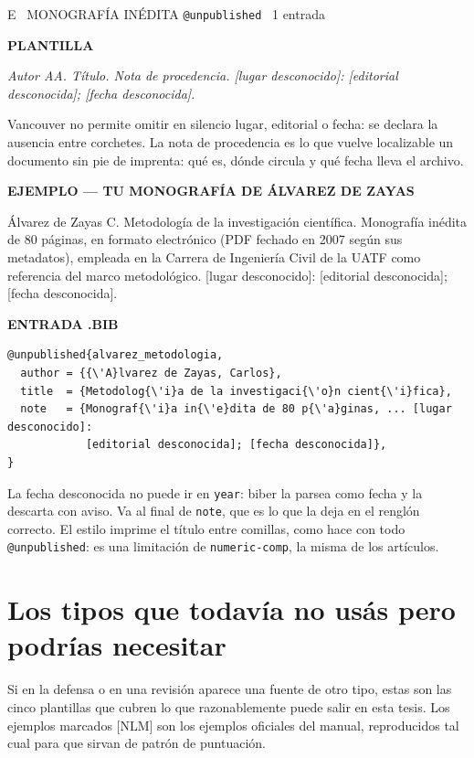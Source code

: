 \documentclass[11pt,a4paper]{article}
\newcommand{\rot}[1]{\vspace{2pt}\par{\footnotesize\bfseries\color{gris}\MakeUppercase{#1}}\par\vspace{1pt}}
\newcommand{\refv}[1]{\par{\small #1}\par}
\newcommand{\plantilla}[1]{\par{\small\itshape\color{tinta} #1}\par}
\newcommand{\anot}[1]{{\color{gris}\footnotesize #1}}
\begin{document}
\begin{ficha}{E \textperiodcentered\ MONOGRAFÍA INÉDITA \hfill \normalfont\texttt{@unpublished} \textperiodcentered\ 1 entrada}
\rot{plantilla}
\plantilla{Autor AA. Título. Nota de procedencia. [lugar desconocido]: [editorial
desconocida]; [fecha desconocida].}
\anot{Vancouver no permite omitir en silencio lugar, editorial o fecha: se declara la
ausencia entre corchetes. La nota de procedencia es lo que vuelve localizable un documento
sin pie de imprenta: qué es, dónde circula y qué fecha lleva el archivo.}

\rot{ejemplo --- tu monografía de Álvarez de Zayas}
\refv{Álvarez de Zayas C. Metodología de la investigación científica. Monografía inédita de
80 páginas, en formato electrónico (PDF fechado en 2007 según sus metadatos), empleada en la
Carrera de Ingeniería Civil de la UATF como referencia del marco metodológico. [lugar
desconocido]: [editorial desconocida]; [fecha desconocida].}

\rot{entrada .bib}
\begin{Verbatim}[fontsize=\small,xleftmargin=4pt]
@unpublished{alvarez_metodologia,
  author = {{\'A}lvarez de Zayas, Carlos},
  title  = {Metodolog{\'i}a de la investigaci{\'o}n cient{\'i}fica},
  note   = {Monograf{\'i}a in{\'e}dita de 80 p{\'a}ginas, ... [lugar desconocido]:
            [editorial desconocida]; [fecha desconocida]},
}
\end{Verbatim}
\anot{La fecha desconocida no puede ir en \texttt{year}: biber la parsea como fecha y la
descarta con aviso. Va al final de \texttt{note}, que es lo que la deja en el renglón
correcto. El estilo imprime el título entre comillas, como hace con todo
\texttt{@unpublished}: es una limitación de \texttt{numeric-comp}, la misma de los
artículos.}
\end{ficha}

\section{Los tipos que todavía no usás pero podrías necesitar}

Si en la defensa o en una revisión aparece una fuente de otro tipo, estas son las cinco
plantillas que cubren lo que razonablemente puede salir en esta tesis. Los ejemplos marcados
\anot{[NLM]} son los ejemplos oficiales del manual, reproducidos tal cual para que sirvan de
patrón de puntuación.
\end{document}
